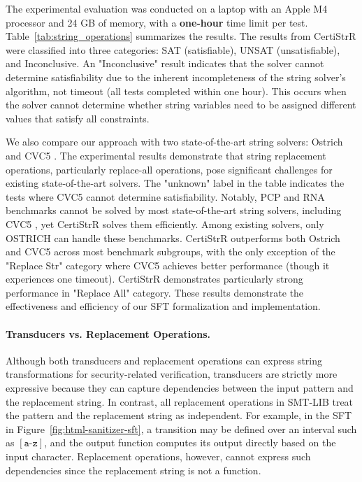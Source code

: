 The experimental evaluation was conducted on a laptop with an Apple M4 processor and 24 GB of memory, with a \textbf{one-hour} time limit per test. Table~\ref{tab:string_operations} summarizes the results. The results from CertiStrR were classified into three categories: SAT (satisfiable), UNSAT (unsatisfiable), and Inconclusive. An "Inconclusive" result indicates that the solver cannot determine satisfiability due to the inherent incompleteness of the string solver's algorithm, not timeout (all tests completed within one hour). This occurs when the solver cannot determine whether string variables need to be assigned different values that satisfy all constraints. 

We also compare our approach with two state-of-the-art string solvers: Ostrich \cite{pacmpl/ChenFHHHKLRW22} and CVC5 \cite{cvc5}.
The experimental results demonstrate that string replacement operations, particularly replace-all operations, pose significant challenges for existing state-of-the-art solvers.
The "unknown" label in the table indicates the tests where CVC5 cannot determine satisfiability. 
Notably, PCP and RNA benchmarks cannot be solved by most state-of-the-art string
solvers, including CVC5 \cite{cvc5}, yet CertiStrR solves
them efficiently. Among existing solvers, only OSTRICH \cite{pacmpl/ChenFHHHKLRW22} can handle these benchmarks.
CertiStrR outperforms both Ostrich and CVC5 across most benchmark subgroups, with the only exception of the "Replace Str" category where CVC5 achieves better performance (though it experiences one timeout). CertiStrR demonstrates particularly strong performance in  "Replace All" category.
These results demonstrate the effectiveness and efficiency of our SFT formalization and implementation.

\paragraph{Transducers vs. Replacement Operations.}
Although both transducers and replacement operations can express string
transformations for security-related verification, transducers are strictly more
expressive because they can capture dependencies between the input pattern and
the replacement string. In contrast, all replacement operations in SMT-LIB treat
the pattern and the replacement string as independent. For example, in the SFT
in Figure~\ref{fig:html-sanitizer-sft}, a transition may be defined over
an interval such as $[\texttt{a-z}]$, and the output function computes its
output directly based on the input character. Replacement operations, however,
cannot express such dependencies since the replacement string is not a function.

